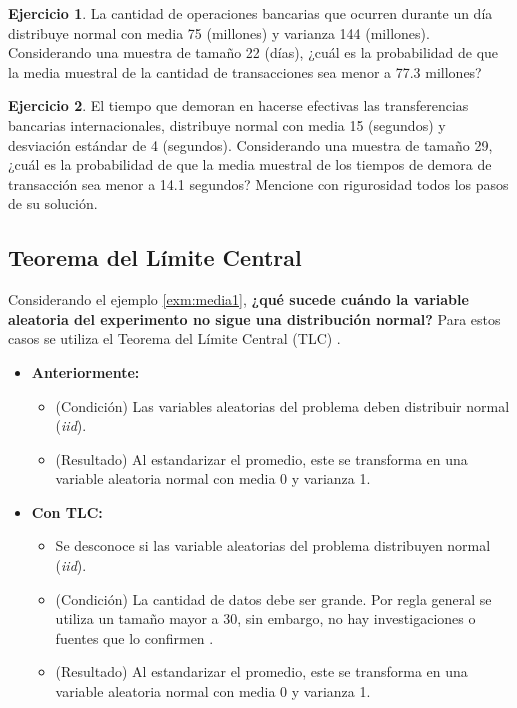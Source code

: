 \documentclass[
  11pt,
]{book}
\providecommand{\tightlist}{%
  \setlength{\itemsep}{0pt}\setlength{\parskip}{0pt}}
\theoremstyle{definition}
\theoremstyle{definition}
\theoremstyle{definition}
\newtheorem{exercise}{Ejercicio}[chapter]
\theoremstyle{definition}
\theoremstyle{remark}
\begin{document}
\begin{exercise}
La cantidad de operaciones bancarias que ocurren durante un día distribuye normal con media 75 (millones) y varianza 144 (millones). Considerando una muestra de tamaño 22 (días), ¿cuál es la probabilidad de que la media muestral de la cantidad de transacciones sea menor a 77.3 millones?
\end{exercise}

\begin{exercise}
El tiempo que demoran en hacerse efectivas las transferencias bancarias internacionales, distribuye normal con media 15 (segundos) y desviación estándar de 4 (segundos). Considerando una muestra de tamaño 29, ¿cuál es la probabilidad de que la media muestral de los tiempos de demora de transacción sea menor a 14.1 segundos? Mencione con rigurosidad todos los pasos de su solución.
\end{exercise}

\subsection{Teorema del Límite Central}\label{teorema-del-luxedmite-central}

Considerando el ejemplo \ref{exm:media1}, \textbf{¿qué sucede cuándo la variable aleatoria del experimento no sigue una distribución normal?} Para estos casos se utiliza el Teorema del Límite Central (TLC) \citep[página 215]{Devore}.

\begin{itemize}
\tightlist
\item
  \textbf{Anteriormente:}

  \begin{itemize}
  \tightlist
  \item
    (Condición) Las variables aleatorias del problema deben distribuir normal (\emph{iid}).
  \item
    (Resultado) Al estandarizar el promedio, este se transforma en una variable aleatoria normal con media 0 y varianza 1.
  \end{itemize}
\item
  \textbf{Con TLC:}

  \begin{itemize}
  \tightlist
  \item
    Se desconoce si las variable aleatorias del problema distribuyen normal (\emph{iid}).
  \item
    (Condición) La cantidad de datos debe ser grande. Por regla general se utiliza un tamaño mayor a 30, sin embargo, no hay investigaciones o fuentes que lo confirmen \citep{johnson1994sample}.
  \item
    (Resultado) Al estandarizar el promedio, este se transforma en una variable aleatoria normal con media 0 y varianza 1.
  \end{itemize}
\end{itemize}
\end{document}
